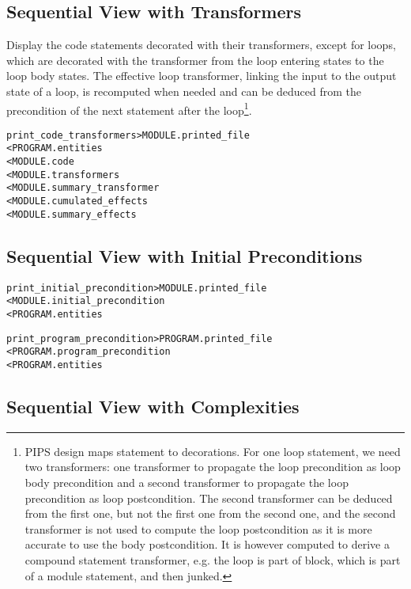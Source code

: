 \documentclass[a4paper]{report}
\newenvironment{PipsMake}{\begin{alltt}}{\end{alltt}}
\newenvironment{PipsPass}[1]{\label{pass:#1}}{}
\begin{document}
\subsection{Sequential View with Transformers}

\begin{PipsPass}{print_code_transformers}
Display the code statements decorated with their transformers, except
for loops, which are decorated with the transformer from the loop
entering states to the loop body states. The effective loop
transformer, linking the input to the output state of a loop, is
recomputed when needed and can be deduced from the precondition of the
next statement after the loop\footnote{PIPS design maps statement to
  decorations. For one loop statement, we need two transformers: one
  transformer to propagate the loop precondition as loop body
  precondition and a second transformer to propagate the loop
  precondition as loop postcondition. The second transformer can be
  deduced from the first one, but not the first one from the second
  one, and the second transformer is not used to compute the loop
  postcondition as it is more accurate to use the body
  postcondition. It is however computed to derive a compound statement
  transformer, e.g. the loop is part of block, which is part of a
  module statement, and then junked.}.
\end{PipsPass}

\begin{PipsMake}
print_code_transformers         > MODULE.printed_file
        < PROGRAM.entities
        < MODULE.code
        < MODULE.transformers
        < MODULE.summary_transformer
        < MODULE.cumulated_effects
        < MODULE.summary_effects
\end{PipsMake}

\subsection{Sequential View with Initial Preconditions}

\begin{PipsMake}
print_initial_precondition  > MODULE.printed_file
        < MODULE.initial_precondition
        < PROGRAM.entities

print_program_precondition  > PROGRAM.printed_file
        < PROGRAM.program_precondition
        < PROGRAM.entities
\end{PipsMake}

\subsection{Sequential View with Complexities}
\end{document}
